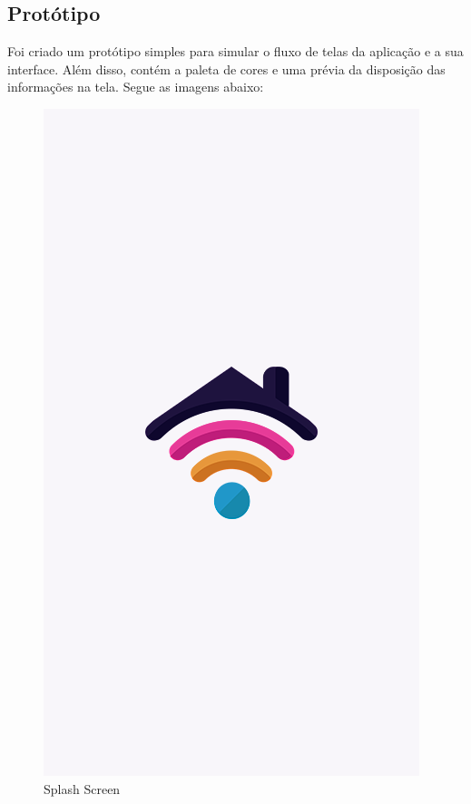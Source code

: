  	        \subsection{Protótipo}
 	            \par Foi criado um protótipo simples para simular o fluxo de telas da aplicação e a sua interface. Além disso, contém a paleta de cores e uma prévia da disposição das informações na tela. Segue as imagens abaixo:
                \graphicspath{ {figuras/} }
                \begin{figure}[h]
                    \centering
                    \includegraphics[scale=0.35]{1}
                    \caption{Splash Screen}
                    \label{fig:splash}
                \end{figure}

